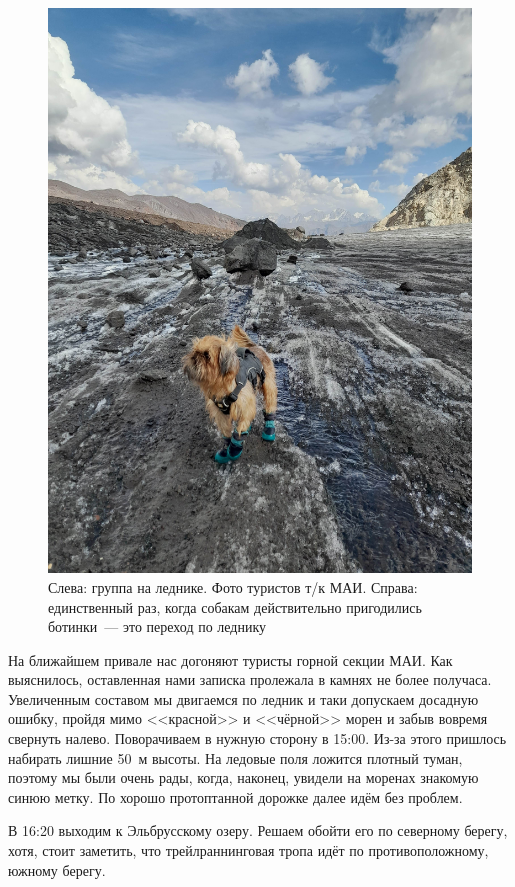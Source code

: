 \begin{figure}[h!]
\begin{minipage}[h]{0.4\linewidth}
		\includegraphics[width=0.99\linewidth]{../pics/20240830_155136.jpg}
	\end{minipage}
	\caption{Слева: группа на леднике. Фото туристов т/к МАИ. Справа: единственный раз, когда собакам действительно пригодились ботинки~--- это переход по леднику}
	\label{fig:20240830_141852}
\end{figure}

На ближайшем привале нас догоняют туристы горной секции МАИ. Как выяснилось, оставленная нами записка пролежала в камнях не более получаса. Увеличенным составом мы двигаемся по ледник и таки допускаем досадную ошибку, пройдя мимо <<красной>> и <<чёрной>> морен и забыв вовремя свернуть налево. Поворачиваем в нужную сторону в 15:00. Из-за этого пришлось набирать лишние 50~м высоты. На ледовые поля ложится плотный туман, поэтому мы были очень рады, когда, наконец, увидели на моренах знакомую синюю метку. По хорошо протоптанной дорожке далее идём без проблем. 

В 16:20 выходим к Эльбрусскому озеру. Решаем обойти его по северному берегу, хотя, стоит заметить, что трейлраннинговая тропа идёт по противоположному, южному берегу.

